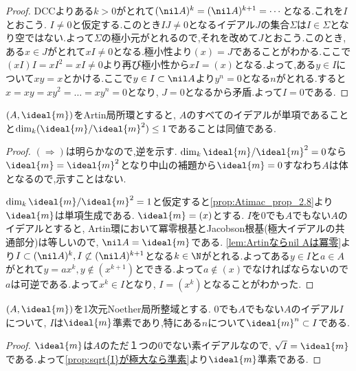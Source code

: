 \begin{proof}
	DCCよりある$k>0$がとれて$(\nil A)^k=(\nil A)^{k+1}=\cdots$となる.これを$I$とおこう. $I\neq0$と仮定する.このとき$IJ\neq0$となるイデアル$J$の集合$\Sigma$は$I\in\Sigma$となり空ではない.よって$\Sigma$の極小元がとれるので,それを改めて$J$とおこう.このとき,ある$x\in J$がとれて$xI\neq0$となる.極小性より$(x)=J$であることがわかる.ここで$(xI)I=xI^2=xI\neq0$より再び極小性から$xI=(x)$となる.よって,ある$y\in I$について$xy=x$とかける.ここで$y\in I\subset\nil A$より$y^n=0$となる$n$がとれる.すると$x=xy=xy^2=\dots=xy^n=0$となり, $J=0$となるから矛盾.よって$I=0$である.
\end{proof}

\begin{prop}\label{lem:DVR-B}
	$(A,\ideal{m})$をArtin局所環とすると, $A$のすべてのイデアルが単項であることと$\dim_k(\ideal{m}/\ideal{m}^2)\leq1$であることは同値である.
\end{prop}

\begin{proof}
	$(\Longrightarrow)$は明らかなので,逆を示す. $\dim_k \ideal{m}/\ideal{m}^2=0$なら$\ideal{m}=\ideal{m}^2$となり中山の補題から$\ideal{m}=0$すなわち$A$は体となるので,示すことはない.
	
	$\dim_k \ideal{m}/\ideal{m}^2=1$と仮定すると\ref{prop:Atimac_prop_2.8}より$\ideal{m}$は単項生成である. $\ideal{m}=(x)$とする. $I$を$0$でも$A$でもない$A$のイデアルとすると, Artin環において冪零根基とJacobson根基(極大イデアルの共通部分)は等しいので, $\nil A=\ideal{m}$である. \ref{lem:Artinならnil Aは冪零}より$I\subset(\nil A)^k,I\not\subset(\nil A)^{k+1}$となる$k\in\N$がとれる.よってある$y\in I$と$a\in A$がとれて$y=ax^k,y\not\in(x^{k+1})$とできる.よって$a\not\in(x)$でなければならないので$a$は可逆である.よって$x^k\in I$となり, $I=(x^k)$となることがわかった.
\end{proof}

\begin{lem}\label{lem:DVR-C}
	$(A,\ideal{m})$を1次元Noether局所整域とする. $0$でも$A$でもない$A$のイデアル$I$について, $I$は$\ideal{m}$準素であり,特にある$n$について$\ideal{m}^n\subset I$である.
\end{lem}

\begin{proof}
	$\ideal{m}$は$A$のただ１つの0でない素イデアルなので, $\sqrt{I}=\ideal{m}$である.よって\ref{prop:sqrt{I}が極大なら準素}より$\ideal{m}$準素である.
\end{proof}

